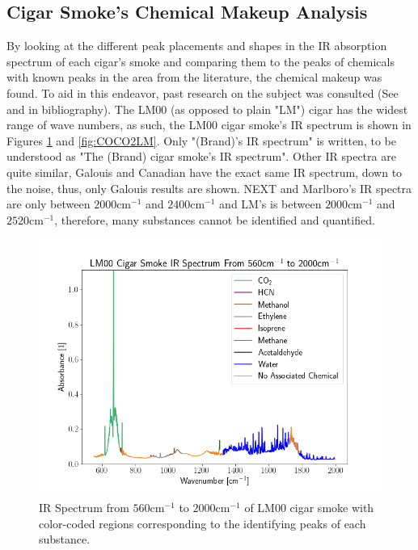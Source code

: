 \documentclass[reprint,amsmath,amssymb,aps, prl,superscriptaddress]{revtex4-2}
\begin{document}
\subsection{Cigar Smoke's Chemical Makeup Analysis}
By looking at the different peak placements and shapes in the IR absorption spectrum of each cigar's smoke and comparing them to the peaks of chemicals with known peaks in the area from the literature\cite{NISTwebook}, 
the chemical makeup was found. To aid in this endeavor, past research
on the subject was consulted (See \cite{IRCEllSMOKE} and \cite{FTIRSPECTRAOFSMOKE} in bibliography). The LM00 (as opposed to plain "LM") cigar has the widest range of wave numbers, as such, the LM00 cigar smoke's IR spectrum is shown in Figures \ref{fig:DiverseLM} and \ref{fig:COCO2LM}. Only "(Brand)'s IR spectrum" is written, to be understood as "The (Brand) cigar smoke's IR spectrum". Other IR spectra are quite similar, Galouis and Canadian have the exact same IR spectrum, down to the noise, thus, only Galouis results are shown. NEXT and Marlboro's IR spectra are only between $2000\text{cm}^{-1}$ and $2400\text{cm}^{-1}$ and LM's is between $2000\text{cm}^{-1}$ and $2520\text{cm}^{-1}$, therefore, many substances cannot be identified and quantified.
\begin{figure}[H]
    \includegraphics[width=\linewidth]{Images/Colored Cigar Spectrums/LM00_Diverse_Spectrum.png} 
    \caption{IR Spectrum from $560 \text{cm}^{-1}$ to $2000\text{cm}^{-1}$ of LM00 cigar smoke with color-coded regions corresponding to the identifying peaks of each substance.}
    \label{fig:DiverseLM}
\end{figure}
\end{document}
